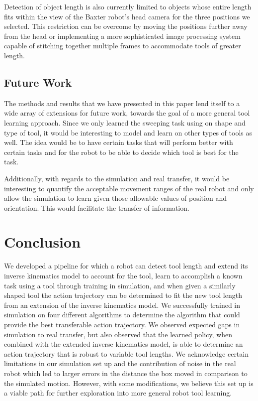\documentclass[conference]{IEEEtran}
\begin{document}
Detection of object length is also currently limited to objects whose entire length fits within the view of the Baxter robot's head camera for the three positions we selected. This restriction can be overcome by moving the positions further away from the head or implementing a more sophisticated image processing system capable of stitching together multiple frames to accommodate tools of greater length. 

\subsection{Future Work}
The methods and results that we have presented in this paper lend itself to a wide array of extensions for future work, towards the goal of a more general tool learning approach. Since we only learned the sweeping task using on shape and type of tool, it would be interesting to model and learn on other types of tools as well. The idea would be to have certain tasks that will perform better with certain tasks and for the robot to be able to decide which tool is best for the task.

Additionally, with regards to the simulation and real transfer, it would be interesting to quantify the acceptable movement ranges of the real robot and only allow the simulation to learn given those allowable values of position and orientation. This would facilitate the transfer of information. 

\section{Conclusion}
We developed a pipeline for which a robot can detect tool length and extend its inverse kinematics model to account for the tool, learn to accomplish a known task using a tool through training in simulation, and when given a similarly shaped tool the action trajectory can be determined to fit the new tool length from an extension of the inverse kinematics model. We successfully trained in simulation on four different algorithms to determine the algorithm that could provide the best transferable action trajectory. We observed expected gaps in simulation to real transfer, but also observed that the learned policy, when combined with the extended inverse kinematics model, is able to determine an action trajectory that is robust to variable tool lengths. We acknowledge certain limitations in our simulation set up and the contribution of noise in the real robot which led to larger errors in the distance the box moved in comparison to the simulated motion. However, with some modifications, we believe this set up is a viable path for further exploration into more general robot tool learning.
\end{document}
